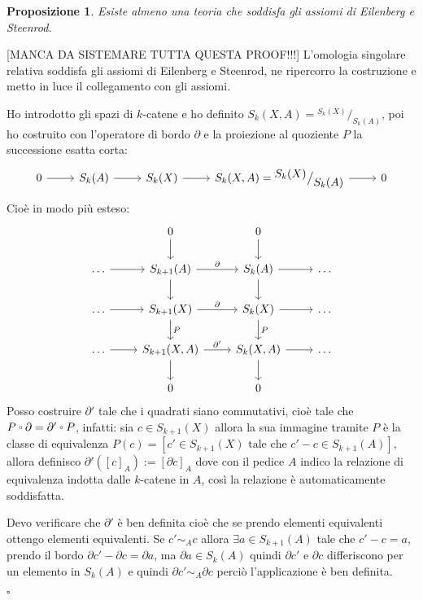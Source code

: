 \documentclass[10pt, twoside=false, x11names]{scrbook}
\newtheorem{proposition}[theorem]{Proposizione}
\newenvironment{proof}{{\textbf{Dimostrazione}:}}{\hfill $\square$}
\newcommand*\quot[2]{{^{\textstyle #1}\big/_{\textstyle #2}}}
\let\latexcirc=\circ
\newcommand{\ccirc}{\mathbin{\mathchoice
  {\xcirc\scriptstyle}
  {\xcirc\scriptstyle}
  {\xcirc\scriptscriptstyle}
  {\xcirc\scriptscriptstyle}
}}
\newcommand{\xcirc}[1]{\vcenter{\hbox{$#1\latexcirc$}}}
\let\circ\ccirc
\begin{document}
\begin{proposition}
  Esiste almeno una teoria che soddisfa gli assiomi di Eilenberg e Steenrod.
\end{proposition}
\begin{proof}
  [MANCA DA SISTEMARE TUTTA QUESTA PROOF!!!]
  L'omologia singolare relativa soddisfa gli assiomi di Eilenberg e Steenrod,
  ne ripercorro la costruzione e metto in luce il collegamento con gli assiomi.

  Ho introdotto gli spazi di $ k $-catene e ho definito $ S_k(X,A) = \quot{S_k(X)}{S_k(A)} $,
  poi ho costruito con l'operatore di bordo $ \partial $ e la proiezione al quoziente $ P $
  la successione esatta corta:
  \[
    \begin{tikzcd}
     0 \rar & S_k(A) \rar & S_k(X) \rar & S_k(X,A) = \quot{S_k(X)}{S_k(A)} \rar & 0
    \end{tikzcd}
  \]
  Cioè in modo più esteso:
  \[
    \begin{tikzcd}
      {} & 0 \arrow{d}{} & 0 \arrow{d}{} & {} \\
      \dots \arrow{r}{} & S_{k+1}(A) \arrow{r}{\partial} \arrow{d}{} & S_k(A) \arrow{r}{} \arrow{d}{} & \dots \\
      \dots \arrow{r}{} & S_{k+1}(X) \arrow{r}{\partial} \arrow{d}{P} & S_k(X) \arrow{r}{} \arrow{d}{P} & \dots \\
      \dots \arrow{r}{} & S_{k+1}(X,A) \arrow{r}{\partial'} \arrow{d}{} & S_k(X,A) \arrow{r}{} \arrow{d}{}& \dots \\
      {} & 0 & 0 & {}
    \end{tikzcd}
  \]
  Posso costruire $ \partial '$  tale che i quadrati siano commutativi, cioè tale che $ P \circ \partial = \partial' \circ P $,
  infatti: sia $ c \in S_{k+1}(X) $ allora la sua immagine tramite $ P $ è la classe di equivalenza
  $ P(c) = [c' \in S_{k+1}(X) \text{ tale che } c'-c \in S_{k+1}(A)] $,
  allora definisco $ \partial'([c]_A) := [\partial c]_A $ dove con il pedice $ A $ indico la relazione
  di equivalenza indotta dalle $ k $-catene in $ A $, così la relazione è automaticamente soddisfatta.

  Devo verificare che $ \partial' $ è ben definita cioè che se prendo elementi
  equivalenti ottengo elementi equivalenti.
  Se $ c' \sim_A c $ allora $ \exists a \in S_{k+1}(A) $ tale che $ c' - c = a $,
  prendo il bordo $ \partial c' - \partial c = \partial a $, ma $ \partial a \in S_k(A) $ quindi
  $ \partial c' $ e $ \partial c $ differiscono per un elemento in $ S_k(A) $ e quindi
  $ \partial c' \sim_A \partial c $ perciò l'applicazione è ben definita.


\end{proof}
\end{document}
